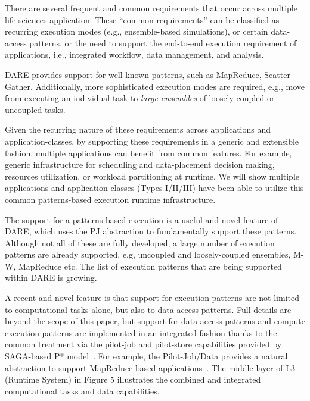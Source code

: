 \documentclass[]{svjour3}
\begin{document}

There are several frequent and common requirements that occur across
multiple life-sciences application.  These ``common requirements'' can
be classified as recurring execution modes (e.g., ensemble-based
simulations), or certain data-access patterns, or the need to support
the end-to-end execution requirement of applications, i.e., integrated
workflow, data management, and analysis.

DARE provides support for well known patterns, such as MapReduce,
Scatter-Gather.  Additionally, more sophisticated execution modes are
required, e.g., move from executing an individual task to
\textit{large ensembles} of loosely-coupled or uncoupled tasks.

Given the recurring nature of these requirements across applications
and application-classes, by supporting these requirements in a generic
and extensible fashion, multiple applications can benefit from common
features.  For example, generic infrastructure for scheduling and
data-placement decision making, resources utilization, or workload
partitioning at runtime. We will show multiple applications and
application-classes (Types I/II/III) have been able to utilize
this common patterns-based execution runtime infrastructure.

The support for a patterns-based execution is a useful and novel
feature of DARE, which uses the PJ abstraction to fundamentally
support these patterns. Although not all of these are fully developed,
a large number of execution patterns are already supported, e.g,
uncoupled and loosely-coupled ensembles, M-W, MapReduce etc. The list
of execution patterns that are being supported within DARE is growing.

A recent and novel feature is that support for execution patterns are
not limited to computational tasks alone, but also to data-access
patterns.  Full details are beyond the scope of this paper, but
support for data-access patterns and compute execution patterns are
implemented in an integrated fashion thanks to the common treatment
via the pilot-job and pilot-store capabilities provided by SAGA-based
P* model~\cite{pstar11}.  For example, the Pilot-Job/Data provides a
natural abstraction to support MapReduce based
applications~\cite{mapreduce12}.  The middle layer of L3 (Runtime
System) in Figure 5 illustrates the combined and integrated
computational tasks and data capabilities.


\end{document}

